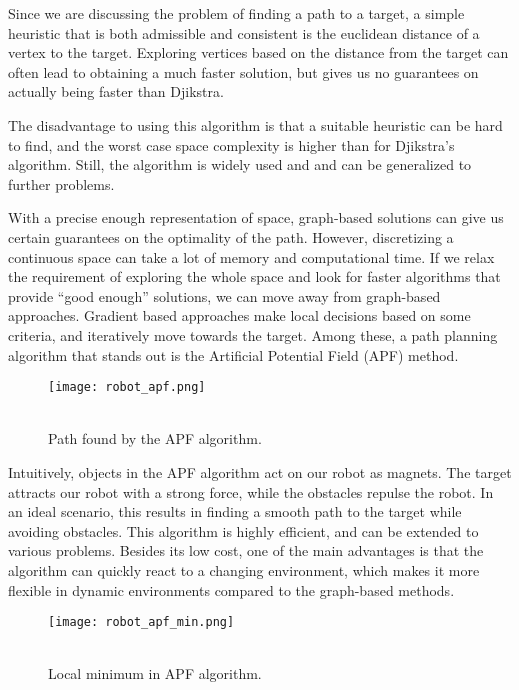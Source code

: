 Since we are discussing the problem of finding a path to a target, a simple heuristic that is both admissible and consistent is the euclidean distance of a vertex to the target. Exploring vertices based on the distance from the target can often lead to obtaining a much faster solution, but gives us no guarantees on actually being faster than Djikstra.

The disadvantage to using this algorithm is that a suitable heuristic can be hard to find, and the worst case space complexity is higher than for Djikstra's algorithm. Still, the algorithm is widely used and and can be generalized to further problems.

With a precise enough representation of space, graph-based solutions can give us certain guarantees on the optimality of the path. However, discretizing a continuous space can take a lot of memory and computational time.
If we relax the requirement of exploring the whole space and look for faster algorithms that provide \enquote{good enough} solutions, we can move away from graph-based approaches. Gradient based approaches make local decisions based on some criteria, and iteratively move towards the target. Among these, a path planning algorithm that stands out is the Artificial Potential Field (APF) method.

\begin{wrapfigure}{r}{0.33\textwidth}
    \centering
    \texttt{[image: robot\_apf.png]}
  \caption{\\Path found by the APF algorithm.}\label{fig:apf}
\end{wrapfigure}

Intuitively, objects in the APF algorithm act on our robot as magnets. The target attracts our robot with a strong force, while the obstacles repulse the robot. In an ideal scenario, this results in finding a smooth path to the target while avoiding obstacles. This algorithm is highly efficient, and can be extended to various problems. Besides its low cost, one of the main advantages is that the algorithm can quickly react to a changing environment, which makes it more flexible in dynamic environments compared to the graph-based methods.

\begin{wrapfigure}{l}{0.33\textwidth}
    \centering
    \texttt{[image: robot\_apf\_min.png]}
  \caption{\\Local minimum in APF algorithm.}\label{fig:apf_min}
\end{wrapfigure}

